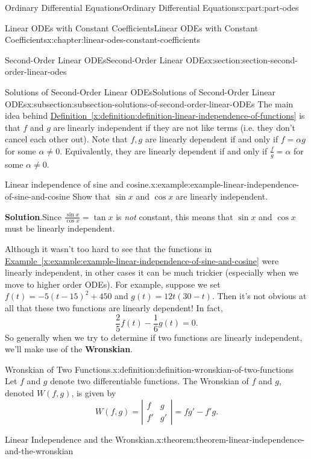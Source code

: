 \documentclass[oneside,10pt,]{book}
\newcommand{\blocktitlefont}{\relax}
\newcommand{\xreffont}{\relax}
\newcommand{\terminology}[1]{\textbf{#1}}
\numberwithin{equation}{part}
\newcommand{\amp}{&}
\begin{document}
\begin{partptx}{Ordinary Differential Equations}{}{Ordinary Differential Equations}{}{}{x:part:part-odes}
\begin{chapterptx}{Linear ODEs with Constant Coefficients}{}{Linear ODEs with Constant Coefficients}{}{}{x:chapter:linear-odes-constant-coefficients}
\begin{sectionptx}{Second-Order Linear ODEs}{}{Second-Order Linear ODEs}{}{}{x:section:section-second-order-linear-odes}
\begin{subsectionptx}{Solutions of Second-Order Linear ODEs}{}{Solutions of Second-Order Linear ODEs}{}{}{x:subsection:subsection-solutions-of-second-order-linear-ODEs}
The main idea behind \hyperref[x:definition:definition-linear-independence-of-functions]{Definition~{\xreffont\ref{x:definition:definition-linear-independence-of-functions}}} is that \(f\) and \(g\) are linearly independent if they are not like terms (i.e. they don't cancel each other out). Note that \(f,g\) are linearly dependent if and only if \(f = \alpha g\) for some \(\alpha\neq 0\). Equivalently, they are linearly dependent if and only if \(\frac{f}{g} = \alpha\) for some \(\alpha\neq0\).%
\begin{example}{Linear independence of sine and cosine.}{x:example:example-linear-independence-of-sine-and-cosine}%
Show that \(\sin x\) and \(\cos x\) are linearly independent.%
\par\smallskip%
\noindent\textbf{\blocktitlefont Solution}.\hypertarget{g:solution:idp105548780398496}{}\quad{}Since \(\frac{\sin x}{\cos x} = \tan x\) is \emph{not} constant, this means that \(\sin x\) and \(\cos x\) must be linearly independent.%
\end{example}
Although it wasn't too hard to see that the functions in \hyperref[x:example:example-linear-independence-of-sine-and-cosine]{Example~{\xreffont\ref{x:example:example-linear-independence-of-sine-and-cosine}}} were linearly independent, in other cases it can be much trickier (especially when we move to higher order ODEs). For example, suppose we set \(f(t) = -5(t-15)^{2} + 450\) and \(g(t) = 12t(30-t)\). Then it's not obvious at all that these two functions are linearly dependent! In fact,%
\begin{equation*}
\frac{2}{5}f(t) - \frac{1}{6}g(t) = 0.
\end{equation*}
So generally when we try to determine if two functions are linearly independent, we'll make use of the \terminology{Wronskian}.%
\begin{definition}{Wronskian of Two Functions.}{x:definition:definition-wronskian-of-two-functions}%
%
Let \(f\) and \(g\) denote two differentiable functions. The Wronskian of \(f\) and \(g\), denoted \(W(f,g)\), is given by%
\begin{equation*}
W(f,g) = \left|\begin{matrix} f \amp g \\ f' \amp g' \end{matrix}\right| = fg' - f'g.
\end{equation*}
%
\end{definition}
\begin{theorem}{Linear Independence and the Wronskian.}{}{x:theorem:theorem-linear-independence-and-the-wronskian}%

\end{theorem}
\end{subsectionptx}
\end{sectionptx}
\end{chapterptx}
\end{partptx}
\end{document}
